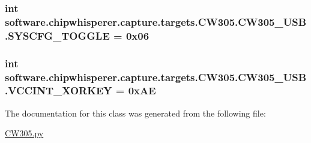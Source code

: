 \subsubsection[{S\+Y\+S\+C\+F\+G\+\_\+\+T\+O\+G\+G\+L\+E}]{\setlength{\rightskip}{0pt plus 5cm}int software.\+chipwhisperer.\+capture.\+targets.\+C\+W305.\+C\+W305\+\_\+\+U\+S\+B.\+S\+Y\+S\+C\+F\+G\+\_\+\+T\+O\+G\+G\+L\+E = 0x06\hspace{0.3cm}{\ttfamily [static]}}\label{classsoftware_1_1chipwhisperer_1_1capture_1_1targets_1_1CW305_1_1CW305__USB_a7cd4af38dd2ed5913bd5022a3a4de373}
\hypertarget{classsoftware_1_1chipwhisperer_1_1capture_1_1targets_1_1CW305_1_1CW305__USB_a760ef20c59a18937d50f50ca410b454c}{}
\subsubsection[{V\+C\+C\+I\+N\+T\+\_\+\+X\+O\+R\+K\+E\+Y}]{\setlength{\rightskip}{0pt plus 5cm}int software.\+chipwhisperer.\+capture.\+targets.\+C\+W305.\+C\+W305\+\_\+\+U\+S\+B.\+V\+C\+C\+I\+N\+T\+\_\+\+X\+O\+R\+K\+E\+Y = 0x\+A\+E\hspace{0.3cm}{\ttfamily [static]}}\label{classsoftware_1_1chipwhisperer_1_1capture_1_1targets_1_1CW305_1_1CW305__USB_a760ef20c59a18937d50f50ca410b454c}


The documentation for this class was generated from the following file\+:\begin{DoxyCompactItemize}
\item 
\hyperlink{CW305_8py}{C\+W305.\+py}\end{DoxyCompactItemize}
